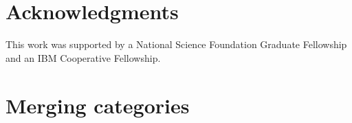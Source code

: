 \documentclass[10pt]{article}
\begin{document}
\section*{Acknowledgments}

This work was supported by a National Science Foundation Graduate
Fellowship and an IBM Cooperative Fellowship.
    


{\small }


\appendix

\section{Merging categories}
\label{app:category-lub}
\end{document}
